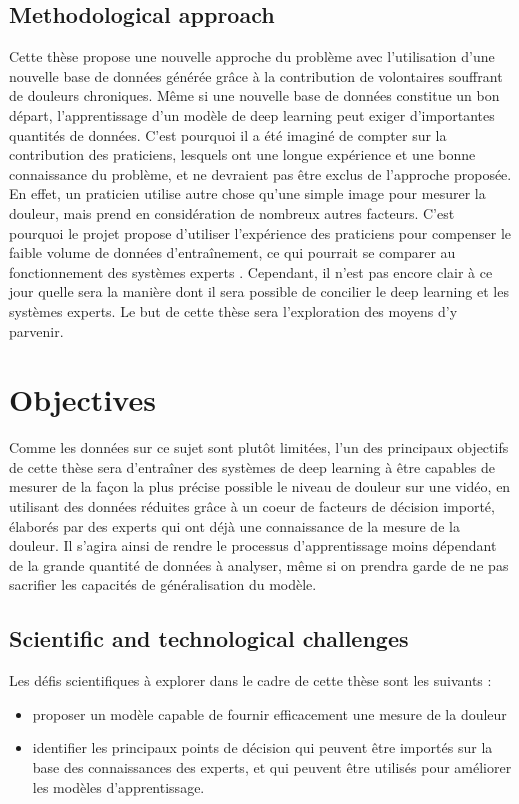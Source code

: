 \documentclass[11pt]{article}
\begin{document}
\subsection{Methodological approach}
\label{sec:org00ed8cb}
Cette thèse propose une nouvelle approche du problème avec l’utilisation d’une nouvelle base
de données générée grâce à la contribution de volontaires souffrant de douleurs chroniques. Même
si une nouvelle base de données constitue un bon départ, l’apprentissage d’un modèle de deep
learning peut exiger d’importantes quantités de données.
C’est pourquoi il a été imaginé de compter sur la contribution des praticiens, lesquels ont une
longue expérience et une bonne connaissance du problème, et ne devraient pas être exclus de
l’approche proposée. En effet, un praticien utilise autre chose qu’une simple image pour mesurer la
douleur, mais prend en considération de nombreux autres facteurs. C’est pourquoi le projet propose
d’utiliser l’expérience des praticiens pour compenser le faible volume de données d’entraînement,
ce qui pourrait se comparer au fonctionnement des systèmes experts \cite{giarratano1998expert}.
Cependant, il n’est pas encore clair à ce jour quelle sera la manière dont il sera possible de
concilier le deep learning et les systèmes experts. Le but de cette thèse sera l’exploration des
moyens d’y parvenir.


\section{Objectives}
\label{sec:orgc54e2f3}
Comme les données sur ce sujet sont plutôt limitées, l’un des principaux objectifs de cette
thèse sera d’entraîner des systèmes de deep learning à être capables de mesurer de la façon la plus
précise possible le niveau de douleur sur une vidéo, en utilisant des données réduites grâce à un
coeur de facteurs de décision importé, élaborés par des experts qui ont déjà une connaissance de la
mesure de la douleur. Il s’agira ainsi de rendre le processus d’apprentissage moins dépendant de la
grande quantité de données à analyser, même si on prendra garde de ne pas sacrifier les capacités de
généralisation du modèle.
\subsection{Scientific and technological challenges}
\label{sec:orgcc64c7c}
Les défis scientifiques à explorer dans le cadre de cette thèse sont les suivants :

\begin{itemize}
\item proposer un modèle capable de fournir efficacement une mesure de la douleur
\item identifier les principaux points de décision qui peuvent être importés sur
la base des connaissances des experts, et qui peuvent être utilisés pour
améliorer les modèles d’apprentissage.
\end{itemize}
\end{document}
